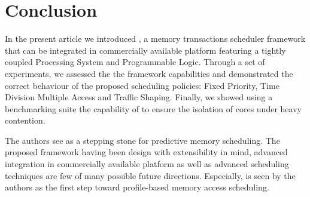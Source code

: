 \section{Conclusion}
    
    In the present article we introduced \schim, a memory transactions scheduler framework that can be integrated in commercially available platform featuring a tightly coupled Processing System and Programmable Logic. Through a set of experiments, we assessed the the framework capabilities and demonstrated the correct behaviour of the proposed scheduling policies: Fixed Priority, Time Division Multiple Access and Traffic Shaping. Finally, we showed using a benchmarking suite the capability of \schim to ensure the isolation of cores under heavy contention.
    
    The authors see \schim as a stepping stone for predictive memory scheduling. The proposed framework having been design with extensibility in mind, advanced integration in commercially available platform as well as advanced scheduling techniques are few of many possible future directions. Especially, \schim is seen by the authors as the first step toward profile-based memory access scheduling.

